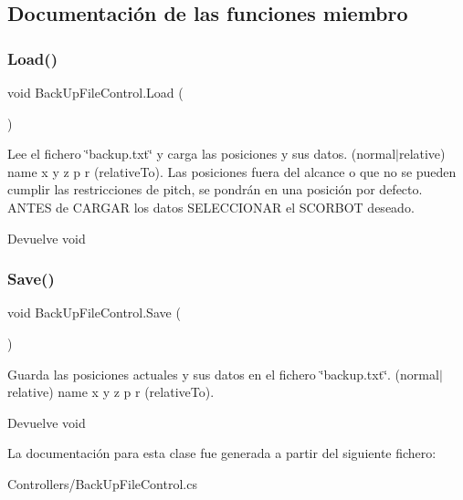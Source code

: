 \subsection{Documentación de las funciones miembro}
\mbox{\label{class_back_up_file_control_a112a5fe6a9344e96275115cdc17b008c}} 
\subsubsection{\texorpdfstring{Load()}{Load()}}
{\footnotesize\ttfamily void Back\+Up\+File\+Control.\+Load (\begin{DoxyParamCaption}{ }\end{DoxyParamCaption})\hspace{0.3cm}{\ttfamily [inline]}}

Lee el fichero \char`\"{}backup.\+txt\char`\"{} y carga las posiciones y sus datos. (normal$\vert$relative) name x y z p r (relative\+To). Las posiciones fuera del alcance o que no se pueden cumplir las restricciones de pitch, se pondrán en una posición por defecto. A\+N\+T\+ES de C\+A\+R\+G\+AR los datos S\+E\+L\+E\+C\+C\+I\+O\+N\+AR el S\+C\+O\+R\+B\+OT deseado. \begin{DoxyReturn}{Devuelve}
void 
\end{DoxyReturn}
\mbox{\label{class_back_up_file_control_ac716204289bfc6374ac1f0f042497db0}} 
\subsubsection{\texorpdfstring{Save()}{Save()}}
{\footnotesize\ttfamily void Back\+Up\+File\+Control.\+Save (\begin{DoxyParamCaption}{ }\end{DoxyParamCaption})\hspace{0.3cm}{\ttfamily [inline]}}

Guarda las posiciones actuales y sus datos en el fichero \char`\"{}backup.\+txt\char`\"{}. (normal$\vert$relative) name x y z p r (relative\+To). \begin{DoxyReturn}{Devuelve}
void 
\end{DoxyReturn}


La documentación para esta clase fue generada a partir del siguiente fichero\+:\begin{DoxyCompactItemize}
\item 
Controllers/Back\+Up\+File\+Control.\+cs\end{DoxyCompactItemize}

